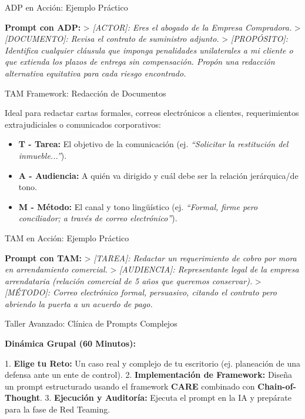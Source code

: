 \documentclass[aspectratio=169]{beamer}
\begin{document}
\begin{frame}[fragile]{ADP en Acción: Ejemplo Práctico}


\textbf{Prompt con ADP:}
> \textit{[ACTOR]: Eres el abogado de la Empresa Compradora.}
> \textit{[DOCUMENTO]: Revisa el contrato de suministro adjunto.}
> \textit{[PROPÓSITO]: Identifica cualquier cláusula que imponga penalidades unilaterales a mi cliente o que extienda los plazos de entrega sin compensación. Propón una redacción alternativa equitativa para cada riesgo encontrado.}

\end{frame}



\begin{frame}[fragile]{TAM Framework: Redacción de Documentos}


Ideal para redactar cartas formales, correos electrónicos a clientes, requerimientos extrajudiciales o comunicados corporativos:

\begin{itemize}
  \item \textbf{T - Tarea:} El objetivo de la comunicación (ej. \textit{``Solicitar la restitución del inmueble...''}).
  \item \textbf{A - Audiencia:} A quién va dirigido y cuál debe ser la relación jerárquica/de tono.
  \item \textbf{M - Método:} El canal y tono lingüístico (ej. \textit{``Formal, firme pero conciliador; a través de correo electrónico''}).
\end{itemize}
\end{frame}



\begin{frame}[fragile]{TAM en Acción: Ejemplo Práctico}


\textbf{Prompt con TAM:}
> \textit{[TAREA]: Redactar un requerimiento de cobro por mora en arrendamiento comercial.}
> \textit{[AUDIENCIA]: Representante legal de la empresa arrendataria (relación comercial de 5 años que queremos conservar).}
> \textit{[MÉTODO]: Correo electrónico formal, persuasivo, citando el contrato pero abriendo la puerta a un acuerdo de pago.}

\end{frame}



\begin{frame}[fragile]{Taller Avanzado: Clínica de Prompts Complejos}


\textbf{Dinámica Grupal (60 Minutos):}

1. \textbf{Elige tu Reto:} Un caso real y complejo de tu escritorio (ej. planeación de una defensa ante un ente de control).
2. \textbf{Implementación de Framework:} Diseña un prompt estructurado usando el framework \textbf{CARE} combinado con \textbf{Chain-of-Thought}.
3. \textbf{Ejecución y Auditoría:} Ejecuta el prompt en la IA y prepárate para la fase de Red Teaming.


\end{frame}
\end{document}
